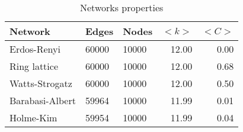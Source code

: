 \begin{table}[h]
\centering
\caption{Networks properties}
\label{tab:networks}
\begin{tabular}{lllrr}
\toprule
         Network &  Edges &  Nodes & $<k>$ & $<C>$ \\
\midrule
     Erdos-Renyi &  60000 &  10000 & 12.00 &  0.00 \\
    Ring lattice &  60000 &  10000 & 12.00 &  0.68 \\
  Watts-Strogatz &  60000 &  10000 & 12.00 &  0.50 \\
 Barabasi-Albert &  59964 &  10000 & 11.99 &  0.01 \\
       Holme-Kim &  59954 &  10000 & 11.99 &  0.04 \\
\bottomrule
\end{tabular}
\end{table}
